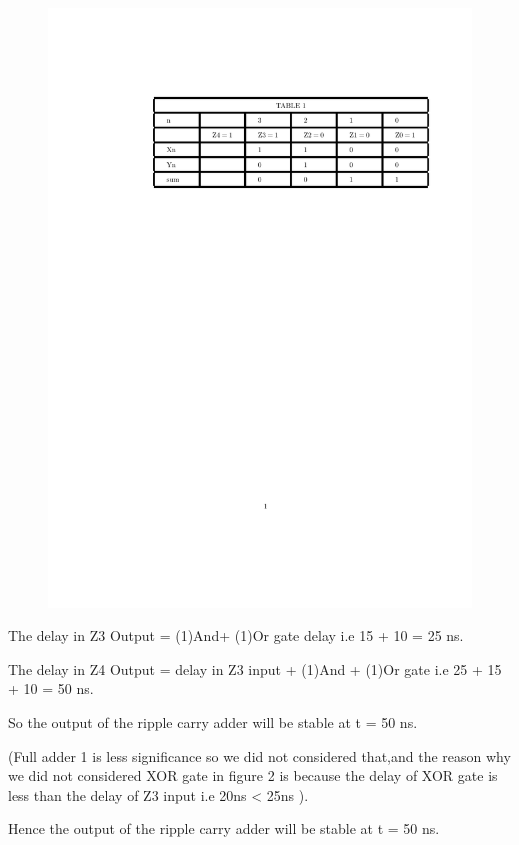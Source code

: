 \documentclass{article}
\begin{document}
\begin{answer}
\begin{figure}[!ht]
	
	\label{quad2.pdf}
\end{figure}
   	\begin{figure}[!ht]
    \centerline{\includegraphics[scale=1.]{table.pdf}}
	
	\label{table.pdf}
\end{figure}
      

      



The delay in Z3 Output = (1)And+ (1)Or gate delay 
i.e 15 + 10 = 25 ns.



The delay in Z4 Output = delay in Z3 input + (1)And + (1)Or gate i.e 25 + 15 + 10 = 50 ns.        
 

So the output of the ripple carry adder will be stable at t = 50 ns.



(Full adder 1 is less significance so we did not considered that,and the reason why we did not considered XOR gate in figure 2  is because the delay of XOR gate is less than the delay of Z3 input i.e 20ns < 25ns ).



Hence the output of the ripple carry adder will be stable at t = 50 ns.


         
         \end{answer}
         


  
\end{document}
